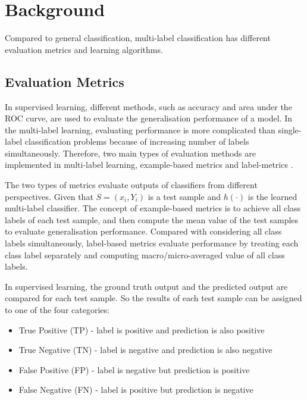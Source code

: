 
\chapter{Background} %
\label{Chapter6}

Compared to general classification, multi-label classification has different evaluation metrics and learning algorithms.

\section{Evaluation Metrics}

In supervised learning, different methods, such as accuracy and area under the ROC curve, are used to evaluate the generalisation performance of a model. In the multi-label learning, evaluating performance is more complicated  than single-label classification problems because of increasing number of labels simultaneously. Therefore, two main types of evaluation methods are implemented in multi-label learning, example-based metrics \citep{ghamrawi2005collective} and label-metrics \citep{tsoumakas2007random}.

The two types of metrics evaluate outputs of classifiers from different perspectives. Given that $S = {(x_{i}, Y_{i})}$ is a test sample and $h(\cdot)$ is the learned multi-label classifier. The concept of example-based metrics is to achieve all class labels of each test sample, and then compute the mean value of the test samples to evaluate generalisation performance. Compared with considering all class labels simultaneously, label-based metrics evaluate performance by treating each class label separately and computing macro/micro-averaged value of all class labels.

In supervised learning, the ground truth output and the predicted output are compared for each test sample. So the results of each test sample can be assigned to one of the four categories:
\begin{itemize}
\item True Positive (TP) - label is positive and prediction is also positive
\item True Negative (TN) - label is negative and prediction is also negative
\item False Positive (FP) - label is negative but prediction is positive
\item False Negative (FN) - label is positive but prediction is negative
\end{itemize}

